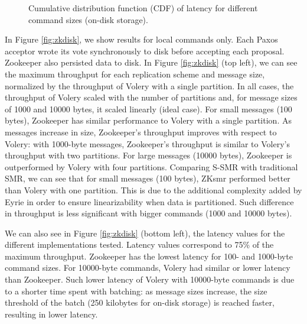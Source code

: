 \begin{figure}
\begin{minipage}[b]{0.3333\linewidth}
\end{minipage}
\caption{Cumulative distribution function (CDF) of latency for different command sizes (on-disk storage).}
\label{fig:zkdiskcdf}
\end{figure}



In Figure \ref{fig:zkdisk}, we show results for local commands only.
Each Paxos acceptor wrote its vote synchronously to disk before accepting each proposal. 
Zookeeper also persisted data to disk. 
In Figure \ref{fig:zkdisk} (top left), we can see the maximum throughput for each replication scheme and message size, normalized by the throughput of Volery with a single partition. 
In all cases, the throughput of Volery scaled with the number of partitions and, for message sizes of 1000 and 10000 bytes, it scaled linearly (ideal case). 
%
%
For small messages (100 bytes), Zookeeper has similar performance to Volery with a single partition.
As messages increase in size, Zookeeper's throughput improves with respect to Volery: with 1000-byte messages, Zookeeper's throughput is similar to Volery's throughput with two partitions.
For large messages (10000 bytes), Zookeeper is outperformed by Volery with four partitions.
%
Comparing S-SMR with traditional SMR, we can see that for small messages (100 bytes), ZKsmr performed better than Volery with one partition. 
This is due to the additional complexity added by Eyrie in order to ensure linearizability when data is partitioned. 
Such difference in throughput is less significant with bigger commands (1000 and 10000 bytes).

We can also see in Figure \ref{fig:zkdisk} (bottom left), the latency values for the different implementations tested. 
Latency values correspond to 75\% of the maximum throughput.
Zookeeper has the lowest latency for 100- and 1000-byte command sizes. 
For 10000-byte commands, Volery had similar or lower latency than Zookeeper. 
Such lower latency of Volery with 10000-byte commands is due to a shorter time spent with batching: as message sizes increase, the size threshold of the batch (250 kilobytes for on-disk storage) is reached faster, resulting in lower latency. %


